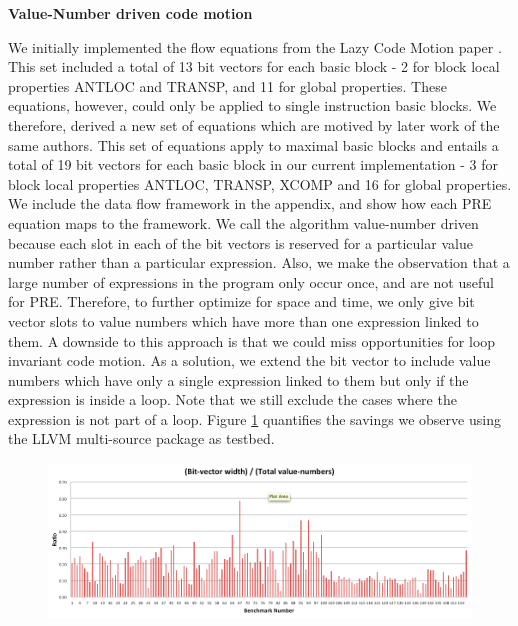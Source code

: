 \documentclass[10pt,twoside]{report}
\begin{document}
\begin{flushleft}
\textbf{\large{Value-Number driven code motion}}
\end{flushleft}
We initially implemented the flow equations from the Lazy Code Motion paper \cite{Knoop}.
This set included a total of 13 bit vectors for each basic block - 2 for block local
properties ANTLOC and TRANSP, and 11 for global properties. These equations,
           however, could only be applied to single instruction basic blocks.
           We therefore, derived a new set of equations which are motived by
           later work\cite{Knoop:1994:OCM:183432.183443} of the same authors.
           This set of equations apply to maximal basic blocks and
           entails a total of 19 bit vectors for each basic block in our
           current implementation - 3 for block local properties ANTLOC,
           TRANSP, XCOMP and 16 for global properties.  We include the
           data flow framework in the appendix, and show how each PRE equation 
	  maps to the framework. We call the algorithm value-number driven because each
           slot in each of the bit vectors is reserved for a particular value
           number rather than a particular expression. Also, we make the
           observation that a large number of expressions in the program only
           occur once, and are not useful for PRE. Therefore, to further optimize
           for space and time, we only give bit vector slots to value numbers
           which have more than one expression linked to them. A downside to this
approach is that we could miss opportunities for loop invariant code motion. As a
      solution, we extend the bit vector to include value numbers which have
      only a single expression linked to them but only if the expression is
      inside a loop. Note that we still exclude the cases where the expression
      is not part of a loop. Figure \ref{fig:barC} quantifies the savings we observe using the LLVM
multi-source package as testbed.

\begin{figure}[htbp]
 \begin{center}
  \includegraphics[scale=0.4]{Figs/barC} 
 \end{center}
 \label{fig:barC} 
\end{figure}
\end{document}
